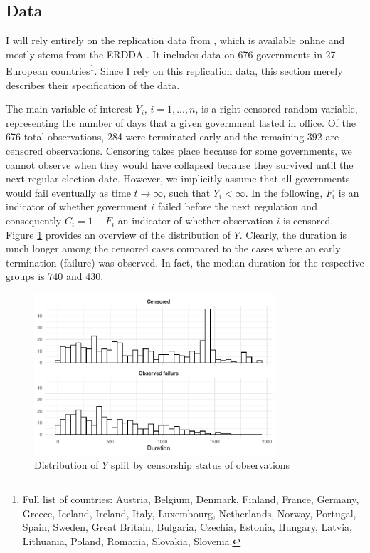\documentclass[11pt]{article}
\newcommand\minp[1]{\begin{minipage}{0.8\textwidth} #1 \end{minipage}}
\begin{document}
\subsection{Data}
I will rely entirely on the replication data from \textcite{KK20}, which is available online and mostly stems from the ERDDA \parencite{ERD2014}. It includes data on 676 governments in 27 European countries\footnote{Full list of countries: Austria, Belgium, Denmark, Finland, France, Germany, Greece, Iceland, Ireland, Italy, Luxembourg, Netherlands, Norway, Portugal, Spain, Sweden, Great Britain, Bulgaria, Czechia, Estonia, Hungary, Latvia, Lithuania, Poland, Romania, Slovakia, Slovenia.}. Since I rely on this replication data, this section merely describes their specification of the data. 

The main variable of interest $Y_i$, $i = 1, ..., n$, is a right-censored random variable, representing the number of days that a given government lasted in office. Of the 676 total observations, 284 were terminated early and the remaining 392 are censored observations. Censoring takes place because for some governments, we cannot observe when they would have collapsed because they survived until the next regular election date. However, we implicitly assume that all governments would fail eventually as time $t \to \infty$, such that $Y_i < \infty$. In the following, $F_i$ is an indicator of whether government $i$ failed before the next regulation and consequently $C_i = 1-F_i$ an indicator of whether observation $i$ is censored. Figure \ref{fig:DVsummary} provides an overview of the distribution of $Y$. Clearly, the duration is much longer among the censored cases compared to the cases where an early termination (failure) was observed. In fact, the median duration for the respective groups is 740 and 430.

\begin{figure}[!ht]
    \centering
    \minp{\caption{Distribution of $Y$ split by censorship status of observations} \label{fig:DVsummary}}
    \includegraphics[width = 0.8\textwidth]{figures/fig5_DVsummary.pdf}
\end{figure}
\end{document}
